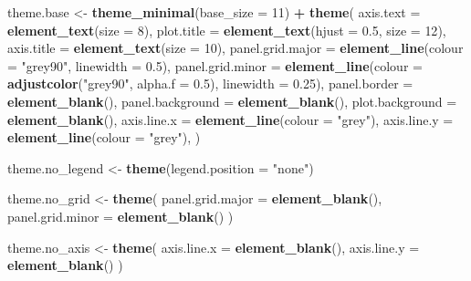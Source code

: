 \documentclass[
]{article}
\newenvironment{Shaded}{\begin{snugshade}}{\end{snugshade}}
\newcommand{\AttributeTok}[1]{\textcolor[rgb]{0.13,0.29,0.53}{#1}}
\newcommand{\DecValTok}[1]{\textcolor[rgb]{0.00,0.00,0.81}{#1}}
\newcommand{\FloatTok}[1]{\textcolor[rgb]{0.00,0.00,0.81}{#1}}
\newcommand{\FunctionTok}[1]{\textcolor[rgb]{0.13,0.29,0.53}{\textbf{#1}}}
\newcommand{\NormalTok}[1]{#1}
\newcommand{\OtherTok}[1]{\textcolor[rgb]{0.56,0.35,0.01}{#1}}
\newcommand{\SpecialCharTok}[1]{\textcolor[rgb]{0.81,0.36,0.00}{\textbf{#1}}}
\newcommand{\StringTok}[1]{\textcolor[rgb]{0.31,0.60,0.02}{#1}}
\begin{document}
\begin{Shaded}
\begin{Highlighting}[]
\NormalTok{theme.base }\OtherTok{\textless{}{-}} \FunctionTok{theme\_minimal}\NormalTok{(}\AttributeTok{base\_size =} \DecValTok{11}\NormalTok{) }\SpecialCharTok{+}
  \FunctionTok{theme}\NormalTok{(}
    \AttributeTok{axis.text =} \FunctionTok{element\_text}\NormalTok{(}\AttributeTok{size =} \DecValTok{8}\NormalTok{),}
    \AttributeTok{plot.title =} \FunctionTok{element\_text}\NormalTok{(}\AttributeTok{hjust =} \FloatTok{0.5}\NormalTok{, }\AttributeTok{size =} \DecValTok{12}\NormalTok{),}
    \AttributeTok{axis.title =} \FunctionTok{element\_text}\NormalTok{(}\AttributeTok{size =} \DecValTok{10}\NormalTok{),}
    \AttributeTok{panel.grid.major =} \FunctionTok{element\_line}\NormalTok{(}\AttributeTok{colour =} \StringTok{"grey90"}\NormalTok{, }\AttributeTok{linewidth =} \FloatTok{0.5}\NormalTok{),}
    \AttributeTok{panel.grid.minor =} \FunctionTok{element\_line}\NormalTok{(}\AttributeTok{colour =} \FunctionTok{adjustcolor}\NormalTok{(}\StringTok{"grey90"}\NormalTok{, }\AttributeTok{alpha.f =} \FloatTok{0.5}\NormalTok{), }\AttributeTok{linewidth =} \FloatTok{0.25}\NormalTok{),}
    \AttributeTok{panel.border =} \FunctionTok{element\_blank}\NormalTok{(),}
    \AttributeTok{panel.background =} \FunctionTok{element\_blank}\NormalTok{(),}
    \AttributeTok{plot.background =} \FunctionTok{element\_blank}\NormalTok{(),}
    \AttributeTok{axis.line.x =} \FunctionTok{element\_line}\NormalTok{(}\AttributeTok{colour =} \StringTok{"grey"}\NormalTok{),}
    \AttributeTok{axis.line.y =} \FunctionTok{element\_line}\NormalTok{(}\AttributeTok{colour =} \StringTok{"grey"}\NormalTok{),}
\NormalTok{  )}

\NormalTok{theme.no\_legend }\OtherTok{\textless{}{-}} \FunctionTok{theme}\NormalTok{(}\AttributeTok{legend.position =} \StringTok{"none"}\NormalTok{)}

\NormalTok{theme.no\_grid }\OtherTok{\textless{}{-}}  \FunctionTok{theme}\NormalTok{(}
  \AttributeTok{panel.grid.major =} \FunctionTok{element\_blank}\NormalTok{(),}
  \AttributeTok{panel.grid.minor =} \FunctionTok{element\_blank}\NormalTok{()}
\NormalTok{)}

\NormalTok{theme.no\_axis }\OtherTok{\textless{}{-}} \FunctionTok{theme}\NormalTok{(}
  \AttributeTok{axis.line.x =} \FunctionTok{element\_blank}\NormalTok{(),}
  \AttributeTok{axis.line.y =} \FunctionTok{element\_blank}\NormalTok{()}
\NormalTok{)}


\end{Highlighting}
\end{Shaded}
\end{document}
